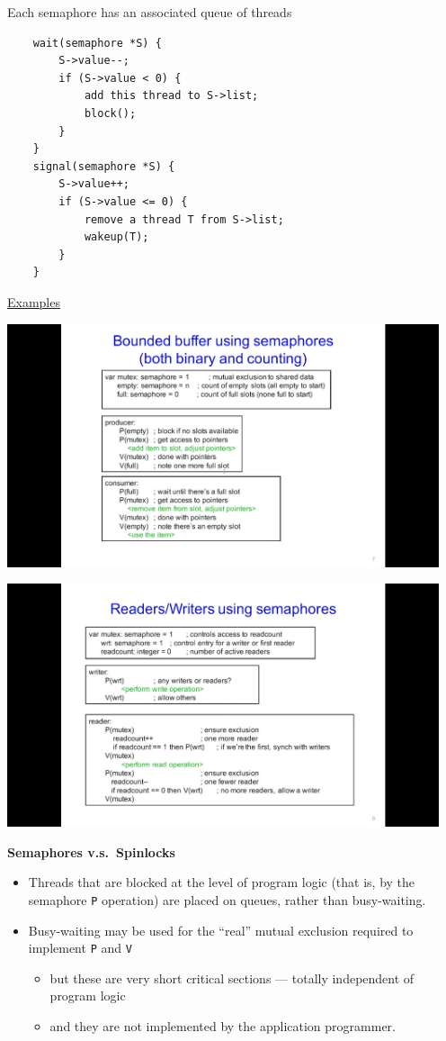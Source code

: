 \documentclass[11pt,a4paper]{article}
\begin{document}
Each semaphore has an associated queue of threads
\begin{verbatim}
    wait(semaphore *S) {
        S->value--;
        if (S->value < 0) {
            add this thread to S->list;
            block();
        }
    }
    signal(semaphore *S) {
        S->value++;
        if (S->value <= 0) {
            remove a thread T from S->list;
            wakeup(T);
        }
    }
\end{verbatim}

\underline{Examples}

\includegraphics[height=270]{bounded-buffer-using-semaphores.jpg}

\includegraphics[height=270]{readers-writers-using-semaphores.jpg}

\textbf{Semaphores v.s.\ Spinlocks}
\begin{itemize}
    \item Threads that are blocked at the level of program logic
        (that is, by the semaphore \texttt{P} operation)
        are placed on queues, rather than busy-waiting.
    \item Busy-waiting may be used for the ``real'' mutual exclusion required to implement
        \texttt{P} and \texttt{V}
        \begin{itemize}
            \item but these are very short critical sections ---
                totally independent of program logic
            \item and they are not implemented by the application programmer.
        \end{itemize}
\end{itemize}
\end{document}
